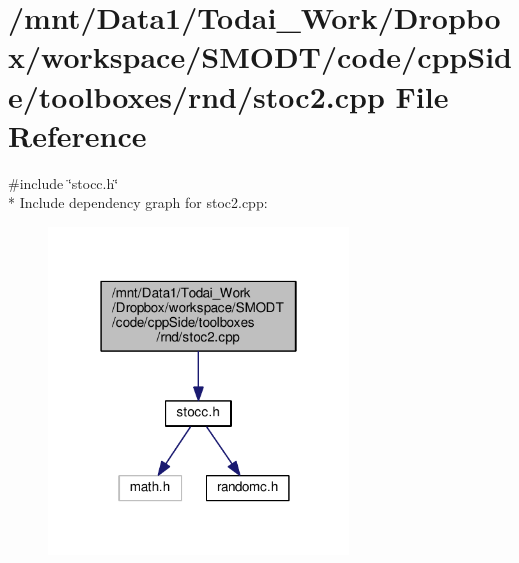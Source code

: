 \section{/mnt/\-Data1/\-Todai\-\_\-\-Work/\-Dropbox/workspace/\-S\-M\-O\-D\-T/code/cpp\-Side/toolboxes/rnd/stoc2.cpp File Reference}
\label{toolboxes_2rnd_2stoc2_8cpp}
{\ttfamily \#include \char`\"{}stocc.\-h\char`\"{}}\\*
Include dependency graph for stoc2.\-cpp\-:\nopagebreak
\begin{figure}[H]
\begin{center}
\leavevmode
\includegraphics[width=226pt]{toolboxes_2rnd_2stoc2_8cpp__incl}
\end{center}
\end{figure}
